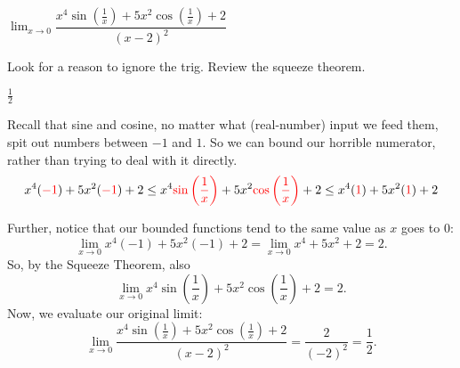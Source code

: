 \begin{question}
$\displaystyle\lim_{x \rightarrow 0}\dfrac{x^4\sin\left(\frac{1}{x}\right)+5x^2\cos\left(\frac{1}{x}\right)+2}{(x-2)^2}$
\end{question}
\begin{hint} Look for a reason to ignore the trig. Review the squeeze theorem.
\end{hint}
\begin{answer} $\frac{1}{2}$
\end{answer}
\begin{solution} Recall that sine and cosine, no matter what (real-number) input we feed them, spit out numbers between $-1$ and $1$. So we can bound our horrible numerator, rather than trying to deal with it directly.
\[x^4(\textcolor{red}{-1})+5x^2(\textcolor{red}{-1})+2
\leq
x^4\textcolor{red}{\sin\left(\frac{1}{x}\right)}+5x^2\textcolor{red}{\cos\left(\frac{1}{x}\right)}+2 \leq
x^4(\textcolor{red}{1})+5x^2(\textcolor{red}{1})+2\]

Further, notice that our bounded functions tend to the same value as $x$ goes to $0$:\\
\[\displaystyle\lim_{x \rightarrow 0} x^4{(-1)}+5x^2{(-1)}+2=
\displaystyle\lim_{x \rightarrow 0} x^4+5x^2+2=2.\] So, by the Squeeze Theorem,
also
\[\displaystyle\lim_{x \rightarrow 0}{x^4\sin\left(\frac{1}{x}\right)+5x^2\cos\left(\frac{1}{x}\right)+2}=2.\] Now, we evaluate our original limit:
\[\displaystyle\lim_{x \rightarrow 0}\dfrac{x^4\sin\left(\frac{1}{x}\right)+5x^2\cos\left(\frac{1}{x}\right)+2}{(x-2)^2}=\frac{2}{(-2)^2}=\frac{1}{2}.\]
\end{solution}



